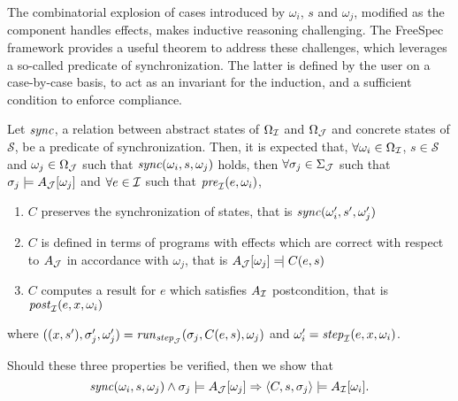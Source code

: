 The combinatorial explosion of cases introduced by $\omega_i$, $s$ and
$\omega_j$, modified as the component handles effects, makes inductive reasoning
challenging.
%
The FreeSpec framework provides a useful theorem to address these challenges,
which leverages a so-called predicate of synchronization.
%
The latter is defined by the user on a case-by-case basis, to act as an
invariant for the induction, and a sufficient condition to enforce compliance.

\begin{theorem} \label{theorem:der-compliance} Let
  $\mathit{sync}$, a relation between abstract states of $\Omega_{\mathcal{I}}$ and
  $\Omega_{\mathcal{J}}$ and concrete states of $\mathcal{S}$, be a predicate of
  synchronization.
  Then, it is expected that, $\forall \omega_i \in \Omega_{\mathcal{I}}$,
  $s \in \mathcal{S}$ and $\omega_j \in \Omega_{\mathcal{J}}$ such that
  $\mathit{sync}(\omega_i, s, \omega_j)$ holds, then
  $\forall \sigma_j \in \Sigma_{\mathcal{J}}$ such that
  $\sigma_j \models A_{\mathcal{J}}[\omega_j]$ and $\forall e \in \mathcal{I}$ such that
  $\mathit{pre}_{\mathcal{I}}(e, \omega_i)$,
  \begin{enumerate}
  \item $C$ preserves the synchronization of states, that is
    $\mathit{sync}(\omega_i', s', \omega_j')$
  \item $C$ is defined in terms of programs with effects which are correct with
    respect to $A_{\mathcal{J}}$ in accordance with $\omega_j$, that is
    $A_{\J}[\omega_j] \modelssym C(e, s)$
  \item $C$ computes a result for $e$ which satisfies $A_{\mathcal{I}}$ postcondition,
    that is $\mathit{post}_{\mathcal{I}}(e, x, \omega_i)$
  \end{enumerate}
  where
  $((x, s'), \sigma_j', \omega_j') = \mathit{run}_{\mathit{step}_{\mathcal{J}}}(\sigma_j,
  C(e, s), \omega_j)$ and $\omega_i' = \mathit{step}_{\mathcal{I}}(e, x, \omega_i)$.

  Should these three properties be verified, then we show that
  \[ \mathit{sync}(\omega_i, s, \omega_j) \wedge \sigma_j \models A_{\mathcal{J}}[\omega_j]
    \Rightarrow \langle C, s, \sigma_j \rangle \models A_{\mathcal{I}}[\omega_i].
  \]
\end{theorem}

